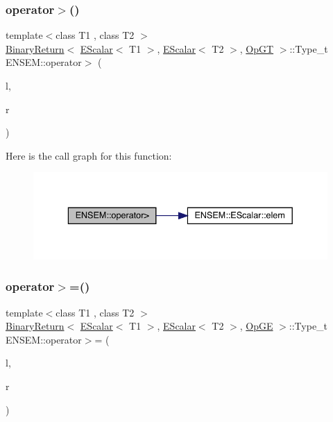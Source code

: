 \subsubsection{\texorpdfstring{operator$>$()}{operator>()}}
{\footnotesize\ttfamily template$<$class T1 , class T2 $>$ \\
\mbox{\hyperlink{structENSEM_1_1BinaryReturn}{Binary\+Return}}$<$ \mbox{\hyperlink{classENSEM_1_1EScalar}{E\+Scalar}}$<$ T1 $>$, \mbox{\hyperlink{classENSEM_1_1EScalar}{E\+Scalar}}$<$ T2 $>$, \mbox{\hyperlink{structENSEM_1_1OpGT}{Op\+GT}} $>$\+::Type\+\_\+t E\+N\+S\+E\+M\+::operator$>$ (\begin{DoxyParamCaption}\item[{const \mbox{\hyperlink{classENSEM_1_1EScalar}{E\+Scalar}}$<$ T1 $>$ \&}]{l,  }\item[{const \mbox{\hyperlink{classENSEM_1_1EScalar}{E\+Scalar}}$<$ T2 $>$ \&}]{r }\end{DoxyParamCaption})\hspace{0.3cm}{\ttfamily [inline]}}

Here is the call graph for this function\+:
\nopagebreak
\begin{figure}[H]
\begin{center}
\leavevmode
\includegraphics[width=336pt]{d4/dca/group__escalar_ga92b83acdab0e4e35ee7687740b1d3a01_cgraph}
\end{center}
\end{figure}
\mbox{\label{group__escalar_ga9635179278abcc85536b21baae58904d}} 
\subsubsection{\texorpdfstring{operator$>$=()}{operator>=()}}
{\footnotesize\ttfamily template$<$class T1 , class T2 $>$ \\
\mbox{\hyperlink{structENSEM_1_1BinaryReturn}{Binary\+Return}}$<$ \mbox{\hyperlink{classENSEM_1_1EScalar}{E\+Scalar}}$<$ T1 $>$, \mbox{\hyperlink{classENSEM_1_1EScalar}{E\+Scalar}}$<$ T2 $>$, \mbox{\hyperlink{structENSEM_1_1OpGE}{Op\+GE}} $>$\+::Type\+\_\+t E\+N\+S\+E\+M\+::operator$>$= (\begin{DoxyParamCaption}\item[{const \mbox{\hyperlink{classENSEM_1_1EScalar}{E\+Scalar}}$<$ T1 $>$ \&}]{l,  }\item[{const \mbox{\hyperlink{classENSEM_1_1EScalar}{E\+Scalar}}$<$ T2 $>$ \&}]{r }\end{DoxyParamCaption})\hspace{0.3cm}{\ttfamily [inline]}}

